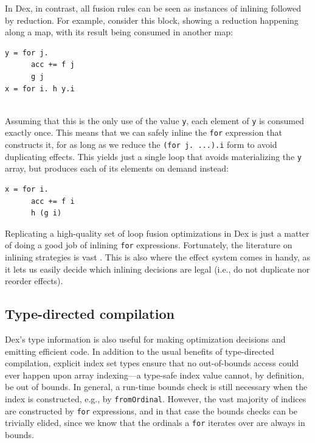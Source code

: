 \documentclass[acmsmall,screen,nonacm]{acmart}
\newlength{\codeindent}
\begin{document}
In Dex, in contrast, all fusion rules can be seen as instances of inlining followed by reduction.
For example, consider this block, showing a reduction happening along a map, with its result being consumed in another map:
\begin{Verbatim}[xleftmargin=\codeindent,fontsize=\small]
y = for j.
      acc += f j
      g j
x = for i. h y.i
\end{Verbatim}
\mbox{}\vspace{-0.5cm} \\
Assuming that this is the only use of the value \texttt{y}, each element of \texttt{y} is consumed exactly once.
This means that we can safely inline the \texttt{for} expression that constructs it, for as long as we reduce the \texttt{(for j. ...).i} form to avoid duplicating effects.
This yields just a single loop that avoids materializing the \texttt{y} array, but produces each of its elements on demand instead:
\begin{Verbatim}[xleftmargin=\codeindent,fontsize=\small]
x = for i.
      acc += f i
      h (g i)
\end{Verbatim}

Replicating a high-quality set of loop fusion optimizations in Dex is just a matter of doing a good job of inlining \texttt{for} expressions.
Fortunately, the literature on inlining strategies is vast \cite{peytonjones2002secrets, mitchell2010rethinking}.
This is also where the effect system comes in handy, as it lets us easily decide which inlining decisions are legal (i.e., do not duplicate nor reorder effects).

\subsection{Type-directed compilation}
\label{sec:type-directed-compilation}

Dex's type information is also useful for making optimization decisions and emitting efficient code. In addition to the usual benefits of type-directed compilation,
explicit index set types ensure that no out-of-bounds access could ever happen upon array indexing---a type-safe index value cannot, by definition, be out of bounds.
In general, a run-time bounds check is still necessary when the index is constructed, e.g., by \texttt{fromOrdinal}.
However, the vast majority of indices are constructed by \texttt{for} expressions, and in that case the bounds checks can be trivially elided, since we know that the ordinals a \texttt{for} iterates over are always in bounds.
\end{document}

